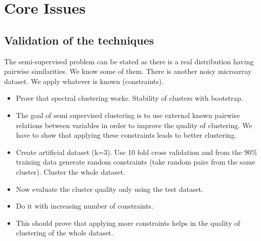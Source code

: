 \documentclass[a4paper,10pt]{article}
\begin{document}
\section{Core Issues}
 \subsection{Validation of the techniques}
The semi-supervised problem can be stated as there is a real distribution having pairwise similarities. We know some of them. There is another noisy microarray dataset. We apply whatever is known (constraints).
\begin{itemize}
  \item Prove that spectral clustering works. Stability of clusters with bootstrap.
  \item The goal of semi supervised clustering is to use external known pairwise relations between variables in order to improve the quality of clustering. We have to show that applying these constraints leads to better clustering.
  \item Create artificial dataset (k=3). Use 10 fold cross validation and from the 90\% training data generate random constraints (take random pairs from the same cluster). Cluster the whole dataset. 
  \item Now evaluate the cluster quality only using the test dataset.
  \item Do it with increasing number of constraints.
  \item This should prove that applying more constraints helps in the quality of clustering of the whole dataset. 
\end{itemize}
\end{document}
